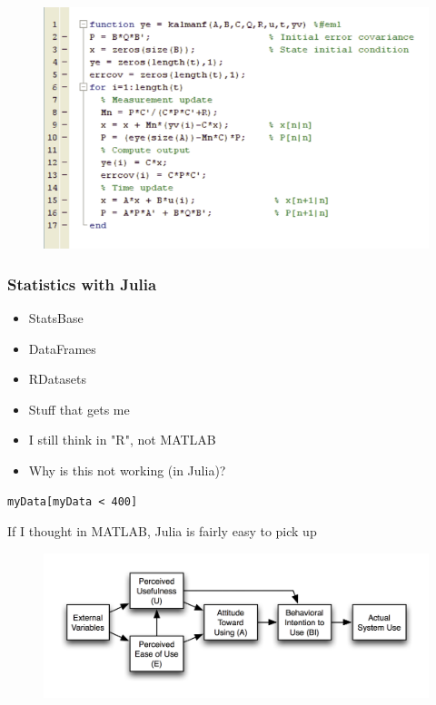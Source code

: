 \documentclass[Master.tex]{subfiles}
\begin{document}
\begin{frame}
\begin{figure}
\centering
\includegraphics[width=0.9\linewidth]{images/MATLAB}
\caption{}
\label{fig:MATLAB}
\end{figure}
\end{frame}
\begin{frame}
	\frametitle{Statistics with Julia}
	\large
	
	\begin{itemize}
		\item StatsBase
		\item DataFrames
		\item RDatasets
	\end{itemize}
	
\end{frame}	
\begin{frame}[fragile]
	\large
\begin{itemize}
\item Stuff that gets me 
	
\item I still think in "R", not MATLAB
	
\item Why is this not working (in Julia)?
\end{itemize}	


\begin{verbatim}
myData[myData < 400]
\end{verbatim}
If I thought in MATLAB, Julia is fairly easy to pick up

\end{frame}
\begin{frame}
	\begin{figure}
\centering
\includegraphics[width=0.7\linewidth]{images/Technology_Acceptance_Model}
\caption{}
\label{fig:Technology_Acceptance_Model}
\end{figure}
\end{frame}
\end{document}
